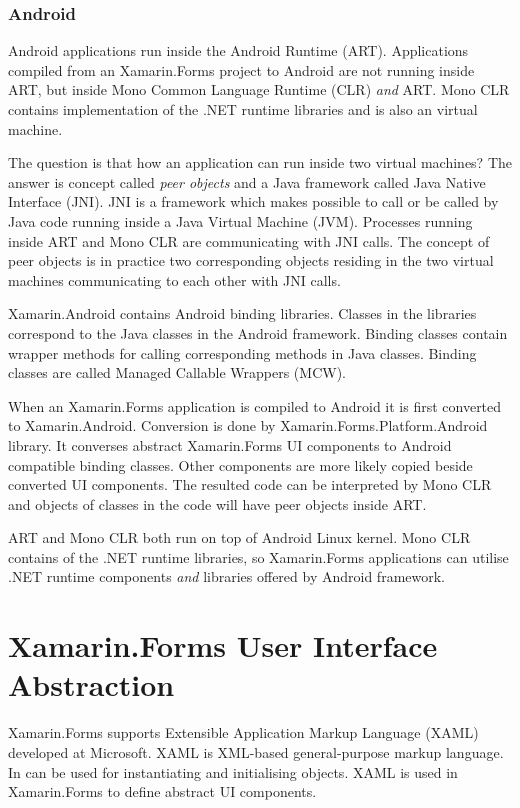 \documentclass[conference]{IEEEtran}
\begin{document}
\subsubsection{Android}

Android applications run inside the Android Runtime (ART). Applications compiled from an Xamarin.Forms project to Android are not running inside ART, but inside Mono Common Language Runtime (CLR) \emph{and} ART. Mono CLR contains implementation of the .NET runtime libraries and is also an virtual machine.

The question is that how an application can run inside two virtual machines? The answer is concept called \emph{peer objects} and a Java framework called Java Native Interface (JNI). JNI is a framework which makes possible to call or be called by Java code running inside a Java Virtual Machine (JVM). Processes running inside ART and Mono CLR are communicating with JNI calls. The concept of peer objects is in practice two corresponding objects residing in the two virtual machines communicating to each other with JNI calls.

Xamarin.Android contains Android binding libraries. Classes in the libraries correspond to the Java classes in the Android framework. Binding classes contain wrapper methods for calling corresponding methods in Java classes. Binding classes are called Managed Callable Wrappers (MCW).

When an Xamarin.Forms application is compiled to Android it is first converted to Xamarin.Android. Conversion is done by Xamarin.Forms.Platform.Android library. It converses abstract Xamarin.Forms UI components to Android compatible binding classes. Other components are more likely copied beside converted UI components. The resulted code can be interpreted by Mono CLR and objects of classes in the code will have peer objects inside ART.

ART and Mono CLR both run on top of Android Linux kernel. Mono CLR contains of the .NET runtime libraries, so Xamarin.Forms applications can utilise .NET runtime components \emph{and} libraries offered by Android framework.

\section{Xamarin.Forms User Interface Abstraction}

Xamarin.Forms supports Extensible Application Markup Language (XAML) developed at Microsoft. XAML is XML-based general-purpose markup language. In can be used for instantiating and initialising objects. XAML is used in Xamarin.Forms to define abstract UI components.
\end{document}
